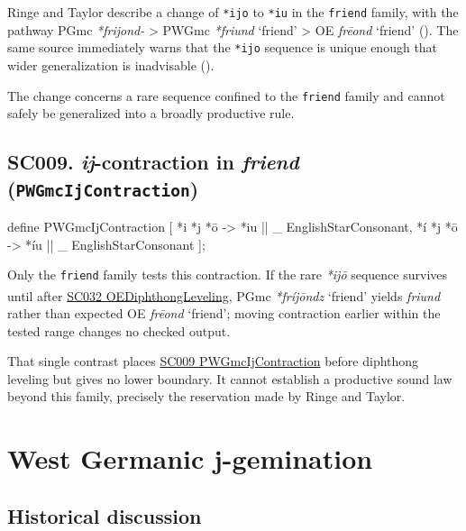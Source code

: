 \documentclass[
  british,
  a4paper,
  openany]{book}
\providecommand{\Pred}[1]{\textsuperscript{\dag}\emph{#1}}
\providecommand{\Recon}[1]{\emph{*#1}}
{\catcode`→=\active \global\def→{\ensuremath{\rightarrow}}}
\providecommand{\texorpdfstring}[2]{#1}
\providecommand{\Pred}[1]{\textsuperscript{\dag}\emph{#1}}
\providecommand{\Recon}[1]{\emph{*#1}}
{\catcode`→=\active \global\def→{\ensuremath{\rightarrow}}}
\begin{document}
Ringe and Taylor describe a change of \texttt{*ijo} to \texttt{*iu} in
the \texttt{friend} family, with the pathway PGmc \emph{*frijond-}
\textgreater{} PWGmc \Recon{friund} `friend' \textgreater{} OE
\emph{frēond} `friend' (). The same source immediately warns that the \texttt{*ijo}
sequence is unique enough that wider generalization is inadvisable
().

The change concerns a rare sequence confined to the \texttt{friend}
family and cannot safely be generalized into a broadly productive rule.

\subsection{\texorpdfstring{SC009. \emph{ij}-contraction in
\emph{friend}
(\texttt{PWGmcIjContraction})}{SC009. -contraction in  (PWGmcIjContraction)}}\label{rule-PWGmcIjContraction}

\begin{ReaderFacingFoma}
define PWGmcIjContraction [
    {*i} {*j} {*ō} -> {*iu} || _ EnglishStarConsonant,
    {*í} {*j} {*ō} -> {*íu} || _ EnglishStarConsonant
];
\end{ReaderFacingFoma}

Only the \texttt{friend} family tests this contraction. If the rare
\emph{*ijō} sequence survives until after
\hyperref[rule-OEDiphthongLeveling]{SC032 OEDiphthongLeveling}, PGmc
\Recon{fríjōndz} `friend' yields \Pred{friund} rather than expected OE
\emph{frēond} `friend'; moving contraction earlier within the tested
range changes no checked output.

That single contrast places \hyperref[rule-PWGmcIjContraction]{SC009
PWGmcIjContraction} before diphthong leveling but gives no lower
boundary. It cannot establish a productive sound law beyond this family,
precisely the reservation made by Ringe and Taylor.

\newpage

\section{West Germanic j-gemination}\label{west-germanic-j-gemination}

\subsection{Historical discussion}\label{historical-discussion-7}
\end{document}
